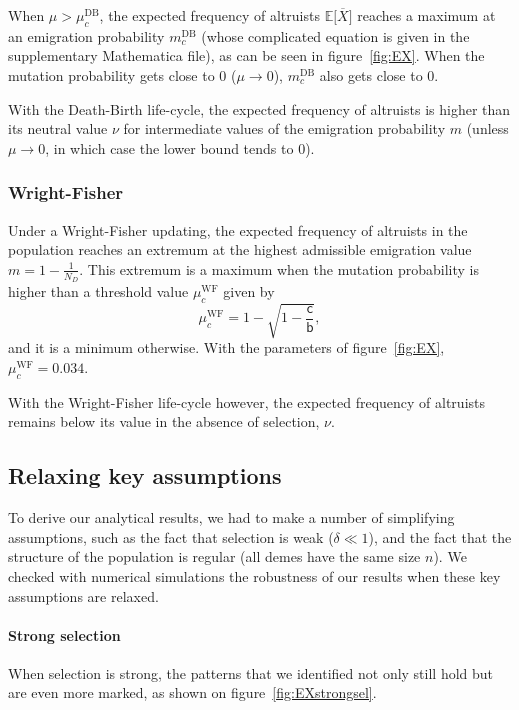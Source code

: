 \documentclass[11pt, letterpaper]{article}
\newcommand{\Esp}[1]{\mathbb{E}\big[ #1\big]}%
\newcommand{\bb}{\mathsf{b}}
\newcommand{\cc}{\mathsf{c}}
\newcommand{\DB}{\textrm{DB}}
\newcommand{\WF}{\textrm{WF}}
\newcommand{\mutbias}{\nu}
\newcommand{\ndemes}{N_D}
\newcommand{\selstr}{\delta}
\begin{document}
When $\mu > \mu_c^{\DB}$, the expected frequency of altruists $\Esp{\overline{X}}$ reaches a maximum at an emigration probability $m_c^{\DB}$ (whose complicated equation is given in the supplementary Mathematica file), as can be seen in figure~\ref{fig:EX}. When the mutation probability gets close to $0$ ($\mu \to 0$), $m_c^{\DB}$ also gets close to $0$.

With the Death-Birth life-cycle, the expected frequency of altruists is higher than its neutral value $\mutbias$ for intermediate values of the emigration probability $m$ (unless $\mu \to 0$, in which case the lower bound tends to $0$).

\subsubsection*{Wright-Fisher}

Under a Wright-Fisher updating, the expected frequency of altruists in the population reaches an extremum at the highest admissible emigration value $m = 1-\frac{1}{\ndemes}$. This extremum is a maximum when the mutation probability is higher than a threshold value $\mu_c^{\WF}$ given by 
\begin{equation}
\mu_c^{\WF} = 1-\sqrt{1-\frac{\cc}{\bb}},
\end{equation}
and it is a minimum otherwise. With the parameters of figure~\ref{fig:EX}, $\mu_c^{\WF} = 0.034$. 

With the Wright-Fisher life-cycle however, the expected frequency of altruists remains below its value in the absence of selection, $\mutbias$. 




\subsection*{Relaxing key assumptions}

To derive our analytical results, we had to make a number of simplifying assumptions, such as the fact that selection is weak ($\selstr \ll 1$), and the fact that the structure of the population is regular (all demes have the same size $n$). We checked with numerical simulations the robustness of our results when these key assumptions are relaxed. 

\paragraph{Strong selection}When selection is strong, the patterns that we identified not only still hold but are even more marked, as shown on figure~\ref{fig:EXstrongsel}. 
\end{document}
